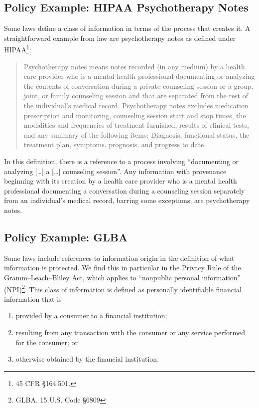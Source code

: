 \documentclass[../thesis.tex]{subfiles}
\begin{document}
\subsection{Policy Example: HIPAA Psychotherapy Notes}
\label{sec:orgheadline3}

Some laws define a class of information in terms
of the process that creates it.
A straightforward example from law are psychotherapy notes
as defined under HIPAA\footnote{45 CFR \S 164.501.}:

\begin{quote}
Psychotherapy notes means notes recorded (in any medium) by a health care provider 
who is a mental health professional documenting or analyzing the contents of 
conversation during a private counseling session or a group, joint, or family 
counseling session and that are separated from the rest of the individual's 
medical record. Psychotherapy notes excludes medication prescription and 
monitoring, counseling session start and stop times, the modalities and 
frequencies of treatment furnished, results of clinical tests, and any 
summary of the following items: Diagnosis, functional status, 
the treatment plan, symptoms, prognosis, and progress to date.
\end{quote}

In this definition, there is a reference to a process involving 
``documenting or analyzing [\ldots] a [\ldots] counseling session''.
Any information with provenance beginning with its creation by a health 
care provider who is a mental health professional documenting a conversation 
during a counseling session separately from an individual's medical record, 
barring some exceptions, are psychotherapy notes.

\subsection{Policy Example: GLBA}
\label{sec:orgheadline4}

Some laws include references to information origin in the 
definition of what information is protected. 
We find this in particular in the Privacy Rule of 
the Gramm--Leach--Bliley Act, which applies to 
``nonpublic personal information'' (NPI)\footnote{GLBA, 15 U.S. Code \S 6809}. 
This class of information is defined as personally identifiable
financial information that is
\begin{enumerate}
\item provided by a consumer to a financial institution;
\item resulting from any transaction with the consumer
  or any service performed for the consumer; or
\item otherwise obtained by the financial institution.
\end{enumerate}
\end{document}
